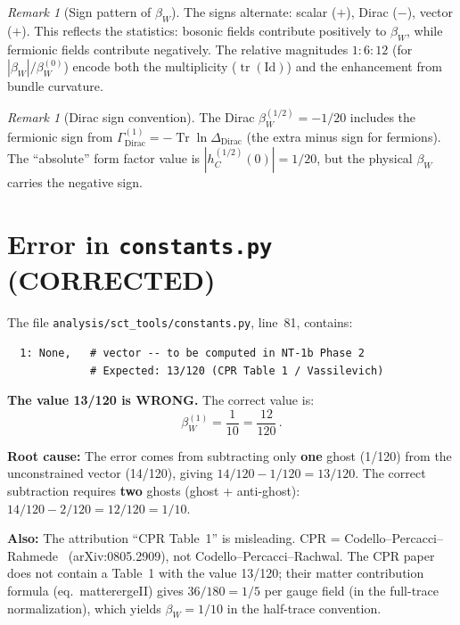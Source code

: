 \documentclass[12pt,a4paper]{article}
\theoremstyle{definition}
\theoremstyle{remark}
\newtheorem{remark}[proposition]{Remark}
\newcommand{\Tr}{\operatorname{Tr}}
\newcommand{\tr}{\operatorname{tr}}
\newcommand{\Id}{\mathrm{Id}}
\begin{document}
\begin{remark}[Sign pattern of $\beta_W$]
The signs alternate: scalar ($+$), Dirac ($-$), vector ($+$).
This reflects the statistics: bosonic fields contribute positively
to $\beta_W$, while fermionic fields contribute negatively.
The relative magnitudes $1:6:12$ (for $|\beta_W|/\beta_W^{(0)}$)
encode both the multiplicity ($\tr(\Id)$) and the enhancement from
bundle curvature.
\end{remark}

\begin{remark}[Dirac sign convention]
\label{rem:dirac-sign}
The Dirac $\beta_W^{(1/2)} = -1/20$ includes the fermionic sign
from $\Gamma^{(1)}_{\mathrm{Dirac}} = -\Tr\ln\Delta_{\mathrm{Dirac}}$
(the extra minus sign for fermions).  The
``absolute'' form factor value is $|h_C^{(1/2)}(0)| = 1/20$,
but the physical $\beta_W$ carries the negative sign.
\end{remark}


\section{Error in \texttt{constants.py} (CORRECTED)}
\label{sec:constants-error}

The file \texttt{analysis/sct\_tools/constants.py}, line~81, contains:
\begin{verbatim}
  1: None,   # vector -- to be computed in NT-1b Phase 2
             # Expected: 13/120 (CPR Table 1 / Vassilevich)
\end{verbatim}

\textbf{The value 13/120 is WRONG.}  The correct value is:
\begin{equation}
  \beta_W^{(1)} = \frac{1}{10} = \frac{12}{120}\,.
\end{equation}

\noindent\textbf{Root cause:}
The error comes from subtracting only \textbf{one} ghost (1/120)
from the unconstrained vector (14/120), giving $14/120 - 1/120 = 13/120$.
The correct subtraction requires \textbf{two} ghosts (ghost + anti-ghost):
$14/120 - 2/120 = 12/120 = 1/10$.

\noindent\textbf{Also:}
The attribution ``CPR Table~1'' is misleading.
CPR = Codello--Percacci--Rahmede~\cite{CPR2009}
(arXiv:0805.2909), not Codello--Percacci--Rachwal.
The CPR paper does not contain a Table~1 with the value 13/120;
their matter contribution formula (eq.~matterergeII) gives
$36/180 = 1/5$ per gauge field (in the full-trace normalization),
which yields $\beta_W = 1/10$ in the half-trace convention.
\end{document}
